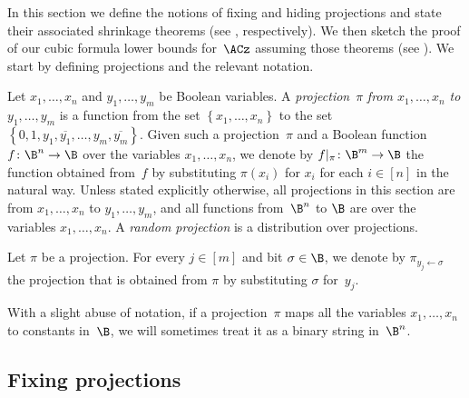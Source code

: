 In this section we define the notions of fixing and hiding projections
and state their associated shrinkage theorems
(see 
, %
respectively). We then sketch the proof of our cubic formula lower
bounds for~$\ACz$ assuming those theorems (see ).
We start by defining projections and the relevant notation.
\begin{definition}
Let $x_{1},\ldots,x_{n}$ and $y_{1},\ldots,y_{m}$ be Boolean variables.
A \emph{projection}~$\pi$ \emph{from $x_{1},\ldots,x_{n}$ to $y_{1},\ldots,y_{m}$}
is a function from the set $\left\{ x_{1},\ldots,x_{n}\right\} $
to the set $\left\{ 0,1,y_{1},\overline{y_{1}},\ldots,y_{m},\overline{y_{m}}\right\} $.
Given such a projection~$\pi$ and a Boolean function~$f\colon\B^{n}\to\B$
over the variables $x_{1},\ldots,x_{n}$, we denote by $f|_{\pi}\colon\B^{m}\to\B$
the function obtained from~$f$ by substituting $\pi(x_{i})$ for
$x_{i}$ for each $i\in\left[n\right]$ in the natural way. Unless
stated explicitly otherwise, all projections in this section are from
\emph{$x_{1},\ldots,x_{n}$} to $y_{1},\ldots,y_{m}$, and all functions
from~$\B^{n}$ to $\B$ are over the variables $x_{1},\ldots,x_{n}$.
A \emph{random projection} is a distribution over projections. 
\end{definition}

\begin{notation}
Let $\pi$ be a projection. For every $j\in[m]$ and bit $\sigma\in\B$,
we denote by $\pi_{y_{j}\gets\sigma}$ the projection that is obtained
from $\pi$ by substituting $\sigma$ for~$y_{j}$. 
\end{notation}

\begin{notation}
With a slight abuse of notation, if a projection~$\pi$ maps all
the variables $x_{1},\ldots,x_{n}$ to constants in~$\B$, we will
sometimes treat it as a binary string in~$\B^{n}$. 
\end{notation}


\subsection{\label{subsec:Fixing-projections}Fixing projections}

